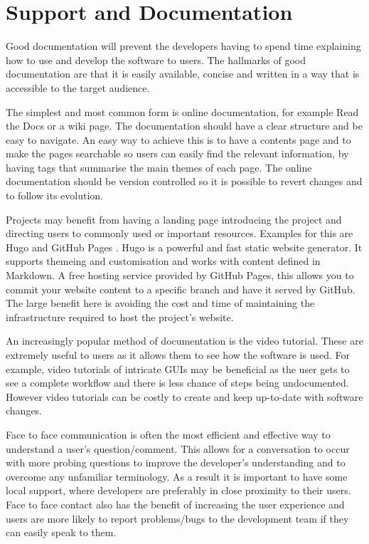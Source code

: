\documentclass[jnr]{iosart2x}
\begin{document}
\section{Support and Documentation}
\label{Support and Documentation}

Good documentation will prevent the developers having to spend time explaining how to use and develop the software to users.
The hallmarks of good documentation are that it is easily available, concise and written in a way that is accessible to the target audience.

The simplest and most common form is online documentation, for example Read the Docs \cite{Read_The_Docs} or a wiki page.
The documentation should have a clear structure and be easy to navigate.
An easy way to achieve this is to have a contents page and to make the pages searchable so users can easily find the relevant information, by having tags that summarise the main themes of each page.
The online documentation should be version controlled so it is possible to revert changes and to follow its evolution.

Projects may benefit from having a landing page introducing the project and directing users to commonly used or important resources.
Examples for this are Hugo \cite{Hugo} and GitHub Pages \cite{GitHub_Pages}.
Hugo is a powerful and fast static website generator.
It supports themeing and customisation and works with content defined in Markdown.
A free hosting service provided by GitHub Pages, this allows you to commit your website content to a specific branch and have it served by GitHub.
The large benefit here is avoiding the cost and time of maintaining the infrastructure required to host the project's website.

An increasingly popular method of documentation is the video tutorial.
These are extremely useful to users as it allows them to see how the software is used.
For example, video tutorials of intricate GUIs may be beneficial as the user gets to see a complete workflow and there is less chance of steps being undocumented.
However video tutorials can be costly to create and keep up-to-date with software changes.

Face to face communication is often the most efficient and effective way to understand a user's question/comment.
This allows for a conversation to occur with more probing questions to improve the developer's understanding and to overcome any unfamiliar terminology.
As a result it is important to have some local support, where developers are preferably in close proximity to their users.
Face to face contact also has the benefit of increasing the user experience and users are more likely to report problems/bugs to the development team if they can easily speak to them.
\end{document}
